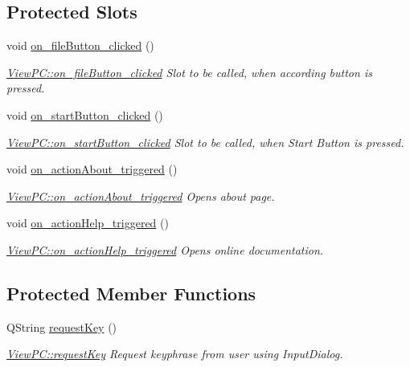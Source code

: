\subsection*{Protected Slots}
\begin{DoxyCompactItemize}
\item 
void \hyperlink{class_view_p_c_a3b9b7a7be9702d8b160f257f1c74a776}{on\-\_\-file\-Button\-\_\-clicked} ()
\begin{DoxyCompactList}\small\item\em \hyperlink{class_view_p_c_a3b9b7a7be9702d8b160f257f1c74a776}{View\-P\-C\-::on\-\_\-file\-Button\-\_\-clicked} Slot to be called, when according button is pressed. \end{DoxyCompactList}\item 
void \hyperlink{class_view_p_c_a456d75b7c5d3a089302a576e7359f1f4}{on\-\_\-start\-Button\-\_\-clicked} ()
\begin{DoxyCompactList}\small\item\em \hyperlink{class_view_p_c_a456d75b7c5d3a089302a576e7359f1f4}{View\-P\-C\-::on\-\_\-start\-Button\-\_\-clicked} Slot to be called, when Start Button is pressed. \end{DoxyCompactList}\item 
void \hyperlink{class_view_p_c_a09a46da4d492eb3dde88f35dc58c997b}{on\-\_\-action\-About\-\_\-triggered} ()
\begin{DoxyCompactList}\small\item\em \hyperlink{class_view_p_c_a09a46da4d492eb3dde88f35dc58c997b}{View\-P\-C\-::on\-\_\-action\-About\-\_\-triggered} Opens about page. \end{DoxyCompactList}\item 
void \hyperlink{class_view_p_c_a0d252ff4829260c6c76769fbd24b7cd7}{on\-\_\-action\-Help\-\_\-triggered} ()
\begin{DoxyCompactList}\small\item\em \hyperlink{class_view_p_c_a0d252ff4829260c6c76769fbd24b7cd7}{View\-P\-C\-::on\-\_\-action\-Help\-\_\-triggered} Opens online documentation. \end{DoxyCompactList}\end{DoxyCompactItemize}
\subsection*{Protected Member Functions}
\begin{DoxyCompactItemize}
\item 
Q\-String \hyperlink{class_view_p_c_a559c95675ec98b15451f3bca47033d9c}{request\-Key} ()
\begin{DoxyCompactList}\small\item\em \hyperlink{class_view_p_c_a559c95675ec98b15451f3bca47033d9c}{View\-P\-C\-::request\-Key} Request keyphrase from user using Input\-Dialog. \end{DoxyCompactList}\end{DoxyCompactItemize}


